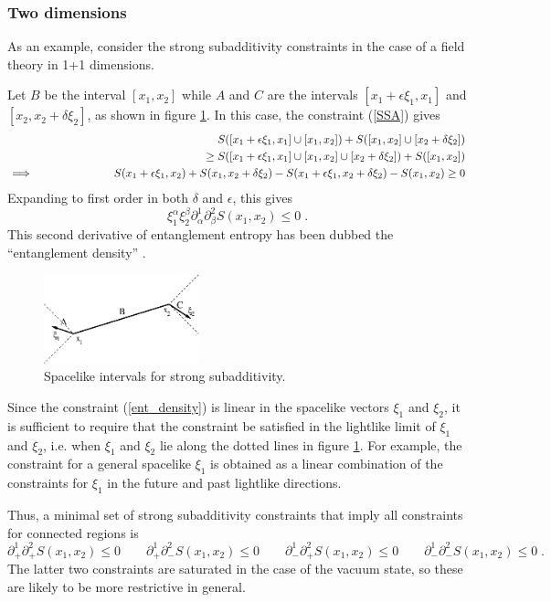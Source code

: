 \documentclass[12pt,epsf]{article}
\newcommand{\be}{\begin{equation}}
\newcommand{\ee}{\end{equation}}
\newcommand{\beas}{\begin{eqnarray*}}
\newcommand{\eeas}{\end{eqnarray*}}
\begin{document}
\subsubsection*{Two dimensions}

As an example, consider the strong subadditivity constraints in the case of a field theory in 1+1 dimensions.

Let $B$ be the interval $[x_1,x_2]$ while $A$ and $C$ are the intervals $[x_1+\epsilon \xi_1,x_1]$ and $[x_2,x_2 + \delta \xi_2]$, as shown in figure \ref{figSSA}. In this case, the constraint (\ref{SSA}) gives
\beas
&& S([x_1+\epsilon \xi_1,x_1] \cup [x_1,x_2]) + S([x_1,x_2] \cup [x_2 + \delta \xi_2]) \cr && \hskip 2 in \ge S([x_1+\epsilon \xi_1,x_1] \cup [x_1,x_2] \cup [x_2 + \delta \xi_2]) + S([x_1,x_2]) \cr
\implies && S(x_1+\epsilon \xi_1,x_2) + S(x_1,x_2 + \delta \xi_2) - S(x_1+\epsilon \xi_1,x_2 + \delta \xi_2) - S(x_1,x_2) \ge 0
\eeas
Expanding to first order in both $\delta$ and $\epsilon$, this gives
\be
\label{ent_density}
\xi_1^\alpha \xi_2^\beta \partial^1_\alpha \partial^2_\beta S(x_1,x_2) \le 0 \; .
\ee
This second derivative of entanglement entropy has been dubbed the ``entanglement density'' \cite{Bhattacharya:2014vja}.

\begin{figure}
\centering
\includegraphics[width=0.4\textwidth]{figSSA.eps}
\caption{Spacelike intervals for strong subadditivity.}
\label{figSSA}
\end{figure}

Since the constraint (\ref{ent_density}) is linear in the spacelike vectors $\xi_1$ and $\xi_2$, it is sufficient to require that the constraint be satisfied in the lightlike limit of $\xi_1$ and $\xi_2$, i.e. when  $\xi_1$ and $\xi_2$ lie along the dotted lines in figure \ref{figSSA}. For example, the constraint for a general spacelike $\xi_1$ is obtained as a linear combination of the constraints for $\xi_1$ in the future and past lightlike directions.

Thus, a minimal set of strong subadditivity constraints that imply all constraints for connected regions is
\be
\label{EDlightlike}
\partial^1_+ \partial^2_+ S(x_1,x_2) \le 0 \qquad
\partial^1_+ \partial^2_- S(x_1,x_2) \le 0 \qquad
\partial^1_- \partial^2_+ S(x_1,x_2) \le 0 \qquad
\partial^1_- \partial^2_- S(x_1,x_2) \le 0\; .
\ee
The latter two constraints are saturated in the case of the vacuum state, so these are likely to be more restrictive in general.
\end{document}
